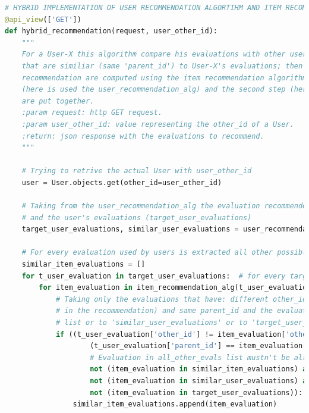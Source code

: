 \lstset{style=python_code_style}
\label{lst:CF_Hybrid}
\begin{lstlisting}[language=Python, caption={Implementazione di un sistema raccomandazione ibrido
	che metta insieme le Raccomandazioni generate dagli algoritmi Item-based e User-based per le Evaluation presenti in Moon Cloud.}]
# HYBRID IMPLEMENTATION OF USER RECOMMENDATION ALGORTIHM AND ITEM RECOMMENDATION ALGORITHM
@api_view(['GET'])
def hybrid_recommendation(request, user_other_id):
	"""
	For a User-X this algorithm compare his evaluations with other users's evaluations and return all the evaluations
	that are similiar (same 'parent_id') to User-X's evaluations; then from all the evaluations used by the User-X other
	recommendation are computed using the item recommendation algorithm; and all the recommendations from the first step
	(here is used the user_recommendation_alg) and the second step (here is used the item_recommendation_alg)
	are put together.
	:param request: http GET request.
	:param user_other_id: value representing the other_id of a User.
	:return: json response with the evaluations to recommend.
	"""

	# Trying to retrive the actual User with user_other_id
	user = User.objects.get(other_id=user_other_id)

	# Taking from the user_recommendation_alg the evaluation recommended from this approach (similar_user_evaluations)
	# and the user's evaluations (target_user_evaluations)
	target_user_evaluations, similar_user_evaluations = user_recommendation_alg(user_other_id)

	# For every evaluation used by users is extracted all other possible evaluations that have the same 'parent_id'
	similar_item_evaluations = []
	for t_user_evaluation in target_user_evaluations:  # for every target user's evaluations
		for item_evaluation in item_recommendation_alg(t_user_evaluation['other_id']):  # is applied the item_recommendation algorithm
			# Taking only the evaluations that have: different other_id (excluding the target evaluation
			# in the recommendation) and same parent_id and the evaluations that weren't added to 'similar_item_evaluations'
			# list or to 'similar_user_evaluations' or to 'target_user_evaluations'
			if ((t_user_evaluation['other_id'] != item_evaluation['other_id']) and # Evaluations must have different 'id'
					(t_user_evaluation['parent_id'] == item_evaluation['parent_id']) and # Evaluations must have the same 'parent_id'
					# Evaluation in all_other_evals list mustn't be already added to \
					not (item_evaluation in similar_item_evaluations) and # the 'similar_item_evaluations' list,
					not (item_evaluation in similar_user_evaluations) and # the 'similar_user_evaluations' list or
					not (item_evaluation in target_user_evaluations)): # the 'target_user_evaluations' list
				similar_item_evaluations.append(item_evaluation)


\end{lstlisting}
